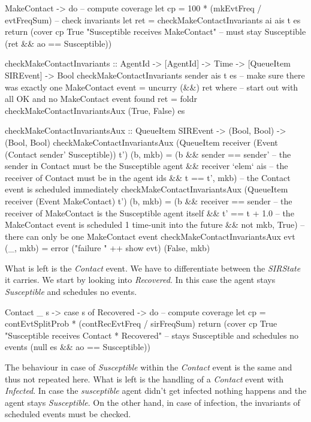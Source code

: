 \begin{HaskellCode}
MakeContact -> do
  -- compute coverage
  let cp  = 100 * (mkEvtFreq / evtFreqSum)
  -- check invariants
  let ret = checkMakeContactInvariants ai ais t es
  return (cover cp True "Susceptible receives MakeContact" 
         -- must stay Susceptible 
         (ret && ao == Susceptible))
         
checkMakeContactInvariants :: AgentId -> [AgentId] -> Time -> [QueueItem SIREvent] -> Bool
checkMakeContactInvariants sender ais t es 
    -- make sure there was exactly one MakeContact event
    = uncurry (&&) ret
  where
    -- start out with all OK and no MakeContact event found
    ret = foldr checkMakeContactInvariantsAux (True, False) es

    checkMakeContactInvariantsAux :: QueueItem SIREvent -> (Bool, Bool) -> (Bool, Bool)
    checkMakeContactInvariantsAux 
        (QueueItem receiver (Event (Contact sender' Susceptible)) t') (b, mkb)
      = (b && sender == sender'    -- the sender in Contact must be the Susceptible agent
           && receiver `elem` ais  -- the receiver of Contact must be in the agent ids
           && t == t', mkb)        -- the Contact event is scheduled immediately
    checkMakeContactInvariantsAux 
        (QueueItem receiver (Event MakeContact) t') (b, mkb) 
      = (b && receiver == sender  -- the receiver of MakeContact is the Susceptible agent itself
           && t' == t + 1.0       -- the MakeContact event is scheduled 1 time-unit into the future
           && not mkb, True)      -- there can only be one MakeContact event
    checkMakeContactInvariantsAux evt (_, mkb) = error ("failure " ++ show evt) (False, mkb)
\end{HaskellCode}

What is left is the \textit{Contact} event. We have to differentiate between the \textit{SIRState} it carries. We start by looking into \textit{Recovered}. In this case the agent stays \textit{Susceptible} and schedules no events. 

\begin{HaskellCode}
Contact _ s -> 
  case s of
    Recovered -> do
      -- compute coverage
      let cp = contEvtSplitProb * (contRecEvtFreq / sirFreqSum)
      return (cover cp True "Susceptible receives Contact * Recovered"
              -- stays Susceptible and schedules no events
              (null es && ao == Susceptible))
\end{HaskellCode}

The behaviour in case of \textit{Susceptible} within the \textit{Contact} event is the same and thus not repeated here. What is left is the handling of a \textit{Contact} event with \textit{Infected}. In case the \textit{susceptible} agent didn't get infected nothing happens and the agent stays \textit{Susceptible}. On the other hand, in case of infection, the invariants of scheduled events must be checked.

